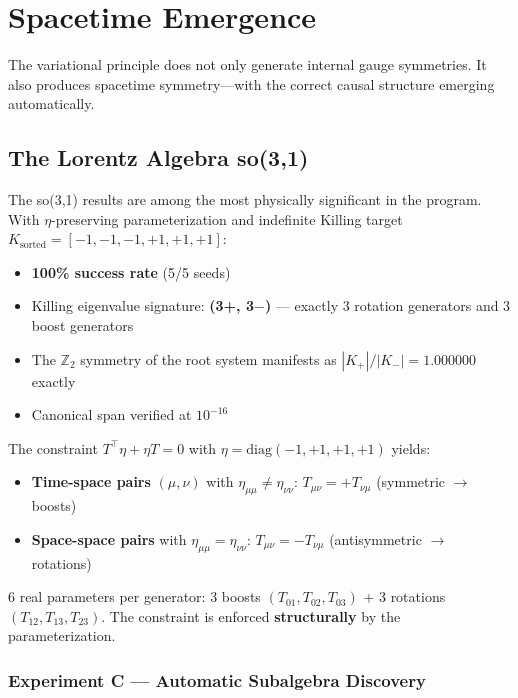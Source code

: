 \section{Spacetime Emergence}\label{sec:spacetime}

The variational principle does not only generate internal gauge symmetries. It also produces spacetime symmetry---with the correct causal structure emerging automatically.

\subsection{The Lorentz Algebra so(3,1)}\label{sec:so31}

The so(3,1) results are among the most physically significant in the program. With $\eta$-preserving parameterization and indefinite Killing target $K_{\mathrm{sorted}} = [-1,-1,-1,+1,+1,+1]$:

\begin{itemize}
\item \textbf{100\% success rate} (5/5 seeds)
\item Killing eigenvalue signature: \textbf{(3+, 3$-$)} --- exactly 3 rotation generators and 3 boost generators
\item The $\mathbb{Z}_2$ symmetry of the root system manifests as $|K_+|/|K_-| = 1.000000$ exactly
\item Canonical span verified at $10^{-16}$
\end{itemize}

The constraint $T^\top \eta + \eta T = 0$ with $\eta = \mathrm{diag}(-1,+1,+1,+1)$ yields:
\begin{itemize}
\item \textbf{Time-space pairs} $(\mu,\nu)$ with $\eta_{\mu\mu} \neq \eta_{\nu\nu}$: $T_{\mu\nu} = +T_{\nu\mu}$ (symmetric $\to$ boosts)
\item \textbf{Space-space pairs} with $\eta_{\mu\mu} = \eta_{\nu\nu}$: $T_{\mu\nu} = -T_{\nu\mu}$ (antisymmetric $\to$ rotations)
\end{itemize}

6 real parameters per generator: 3 boosts $(T_{01}, T_{02}, T_{03})$ + 3 rotations $(T_{12}, T_{13}, T_{23})$. The constraint is enforced \textbf{structurally} by the parameterization.

\subsubsection{Experiment C --- Automatic Subalgebra Discovery}

